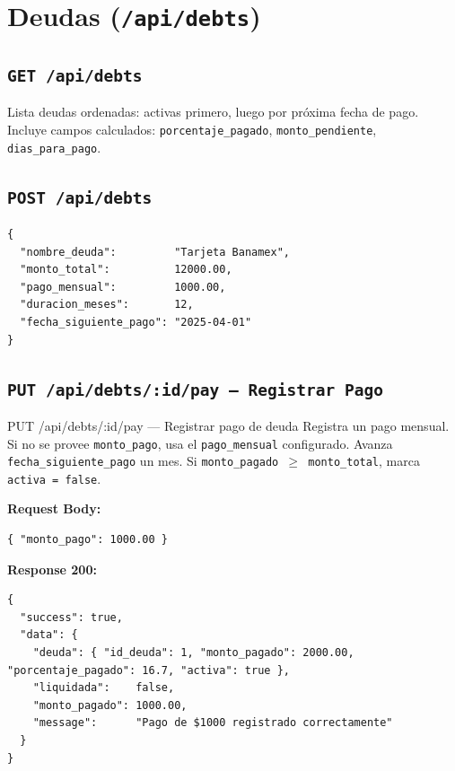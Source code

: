 \section{Deudas (\texttt{/api/debts})}

\subsection{\texttt{GET /api/debts}}
Lista deudas ordenadas: activas primero, luego por próxima fecha de pago. Incluye campos calculados: \texttt{porcentaje\_pagado}, \texttt{monto\_pendiente}, \texttt{dias\_para\_pago}.

\subsection{\texttt{POST /api/debts}}
\begin{lstlisting}[style=json]
{
  "nombre_deuda":         "Tarjeta Banamex",
  "monto_total":          12000.00,
  "pago_mensual":         1000.00,
  "duracion_meses":       12,
  "fecha_siguiente_pago": "2025-04-01"
}
\end{lstlisting}

\subsection{\texttt{PUT /api/debts/:id/pay --- Registrar Pago}}

\begin{epbox}{PUT /api/debts/:id/pay --- Registrar pago de deuda}
Registra un pago mensual. Si no se provee \texttt{monto\_pago}, usa el \texttt{pago\_mensual} configurado. Avanza \texttt{fecha\_siguiente\_pago} un mes. Si \texttt{monto\_pagado $\geq$ monto\_total}, marca \texttt{activa = false}.

\textbf{Request Body:}
\begin{lstlisting}[style=json]
{ "monto_pago": 1000.00 }
\end{lstlisting}

\textbf{Response 200:}
\begin{lstlisting}[style=json]
{
  "success": true,
  "data": {
    "deuda": { "id_deuda": 1, "monto_pagado": 2000.00, "porcentaje_pagado": 16.7, "activa": true },
    "liquidada":    false,
    "monto_pagado": 1000.00,
    "message":      "Pago de $1000 registrado correctamente"
  }
}
\end{lstlisting}
\end{epbox}

